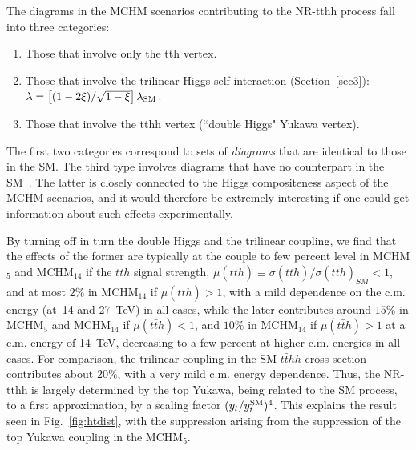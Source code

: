 \label{NRtth}
The diagrams in the MCHM scenarios contributing to the NR-tthh process
fall into three categories:
%
\begin{enumerate}
\item Those that involve only the tth vertex.
\item Those that involve the trilinear Higgs self-interaction (Section~\ref{sec3}):
$\lambda = \left[ (1 - 2 \xi)/\sqrt{1 - \xi} \right] \lambda_{\rm
SM}$.
\item Those that involve the tthh vertex (``double Higgs" Yukawa vertex).
\end{enumerate}
%
The first two categories correspond to sets of \textit{diagrams} that
are identical to those in the SM. The third type involves diagrams
that have no counterpart in the SM~\cite{Contino:2012xk}.  The latter
is closely connected to the Higgs compositeness aspect of the MCHM
scenarios, and it would therefore be extremely interesting if one
could get information about such effects experimentally.

By turning off in turn the double Higgs and the trilinear coupling, we find that the effects of the former are
typically at the couple to few percent level in MCHM$_5$ and MCHM$_{14}$ if the $t\bar{t}h$ signal strength,
$\mu(t\bar{t}h) \equiv \sigma(t\bar{t}h)/{\sigma(t\bar{t}h)}_{SM} < 1$, 
and at most $2\%$ in MCHM$_{14}$ if $\mu(t\bar{t}h) > 1$, with a mild dependence
on the c.m. energy (at~14 and 27~TeV) in all cases, while the later contributes around $15\%$ in MCHM$_5$ and MCHM$_{14}$ if $\mu(t\bar{t}h) < 1$, and $10\%$ in MCHM$_{14}$ if $\mu(t\bar{t}h) > 1$ at a c.m. energy of 14~TeV, decreasing to a few
percent at higher c.m. energies in all cases.  For comparison, the trilinear coupling in the SM $t\bar{t}hh$ cross-section
contributes about $20\%$, with a very mild c.m. energy dependence.  Thus, the NR-tthh is largely determined
by the top Yukawa, being related to the SM process, to a first approximation, by a scaling factor $(y_t / y_t^ {\rm SM})^4$.
This explains the result seen in Fig.~\ref{fig:htdist}, with the
suppression arising from the suppression of the top Yukawa coupling in
the MCHM$_5$.

